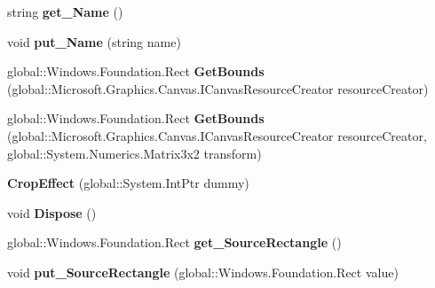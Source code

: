 \begin{DoxyCompactItemize}
string {\bfseries get\+\_\+\+Name} ()
\item 
\mbox{\label{class_microsoft_1_1_graphics_1_1_canvas_1_1_effects_1_1_crop_effect_a01378ce5907a9c77e65397173594ba4a}} 
void {\bfseries put\+\_\+\+Name} (string name)
\item 
\mbox{\label{class_microsoft_1_1_graphics_1_1_canvas_1_1_effects_1_1_crop_effect_a9205352b6c62c823e67992127aa11346}} 
global\+::\+Windows.\+Foundation.\+Rect {\bfseries Get\+Bounds} (global\+::\+Microsoft.\+Graphics.\+Canvas.\+I\+Canvas\+Resource\+Creator resource\+Creator)
\item 
\mbox{\label{class_microsoft_1_1_graphics_1_1_canvas_1_1_effects_1_1_crop_effect_a16b720a896e82a3c3dd7f6de5b04f6f0}} 
global\+::\+Windows.\+Foundation.\+Rect {\bfseries Get\+Bounds} (global\+::\+Microsoft.\+Graphics.\+Canvas.\+I\+Canvas\+Resource\+Creator resource\+Creator, global\+::\+System.\+Numerics.\+Matrix3x2 transform)
\item 
\mbox{\label{class_microsoft_1_1_graphics_1_1_canvas_1_1_effects_1_1_crop_effect_a0c77e082f46f52291276ece0f7fae253}} 
{\bfseries Crop\+Effect} (global\+::\+System.\+Int\+Ptr dummy)
\item 
\mbox{\label{class_microsoft_1_1_graphics_1_1_canvas_1_1_effects_1_1_crop_effect_a9b3ea35f19a680f460f21d9a9e788048}} 
void {\bfseries Dispose} ()
\item 
\mbox{\label{class_microsoft_1_1_graphics_1_1_canvas_1_1_effects_1_1_crop_effect_a7623c2c77a5d02cdfdd9c57daadea17b}} 
global\+::\+Windows.\+Foundation.\+Rect {\bfseries get\+\_\+\+Source\+Rectangle} ()
\item 
\mbox{\label{class_microsoft_1_1_graphics_1_1_canvas_1_1_effects_1_1_crop_effect_a1d926a1f046dba84ddf63f41d43adb8d}} 
void {\bfseries put\+\_\+\+Source\+Rectangle} (global\+::\+Windows.\+Foundation.\+Rect value)

\end{DoxyCompactItemize}
